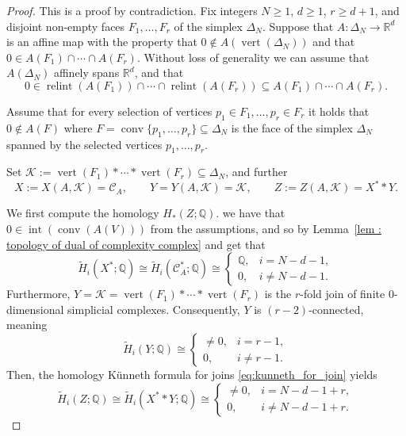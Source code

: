 \documentclass[a4paper,11pt,reqno, english]{amsart}
\theoremstyle{definition}
\theoremstyle{remark}
\newcommand\R{\mathbb R}
\newcommand\Q{\mathbb Q}
\newcommand\CC{\mathscr C}
\DeclareMathOperator{\vertex}{\mathrm{vert}}
\DeclareMathOperator{\interior}{\mathrm{int}}
\DeclareMathOperator{\relint}{\mathrm{relint}}
\DeclareMathOperator{\conv}{\mathrm{conv}}
\begin{document}
\begin{proof}
	This is a proof by contradiction.
	Fix integers $N\geq 1$, $d\geq 1$,  $r\geq d+1$, and disjoint non-empty faces $F_1,\dots, F_{r}$ of the simplex $\Delta_N$.
	Suppose that $A\colon \Delta_N\longrightarrow\R^d$ is an affine map with the property that $0\notin A(\vertex(\Delta_N))$ and that
	$
		0\in A(F_1)\cap\cdots\cap A(F_r)
	$.
	Without loss of generality we can assume that $A(\Delta_N)$ affinely spans $\R^d$, and that
	\[
		0\in \relint( A(F_1))\cap\cdots\cap  \relint(A( F_r)) \subseteq A(F_1)\cap\cdots\cap A(F_r).
	\]

	\medskip
	Assume that for every selection of vertices $p_1\in F_1,\dots, p_r\in F_r$ it holds that $0\notin A(F)$ where $F=\conv\{p_1,\dots,p_r\}\subseteq\Delta_N$ is the face of the simplex $\Delta_N$ spanned by the selected vertices  $p_1,\dots,p_r$.

	\medskip
	Set $\mathcal{K}:=\vertex ({F_1})*\cdots* \vertex ({F_r})\subseteq\Delta_N$, and further
	\[
		X:=X(A,\mathcal{K})=\CC_A,\qquad Y=Y(A,\mathcal{K})=\mathcal{K}, \qquad Z:=Z(A,\mathcal{K})=X^**Y.
	\]

	\medskip
	We first compute the homology $H_*(Z;\Q)$.
	we have that $0\in \interior(\conv (A(V)))$ from the assumptions, and so by
	Lemma~\ref{lem : topology of dual of complexity complex} and get that
	\[
		\widetilde{H}_i(X^*;\Q)\cong \widetilde{H}_i(\CC_A^*;\Q) \cong
		\begin{cases}
			\Q, & i= N-d-1 ,    \\
			0,  & i\neq N-d-1 .
		\end{cases}
	\]
	Furthermore, $Y=\mathcal{K}=\vertex ({F_1})*\cdots* \vertex ({F_r})$ is the $r$-fold join of finite $0$-dimensional simplicial complexes.
	Consequently, $Y$ is $(r-2)$-connected, meaning
	\[
		\widetilde{H}_i(Y;\Q) \cong
		\begin{cases}
			\neq 0, & i= r-1,    \\
			0,      & i\neq r-1.
		\end{cases}
	\]
	Then, the homology K\"unneth formula for joins \eqref{eq:kunneth_for_join} yields
	\begin{equation}
		\label{eq : homology of Z -- C01}
		\widetilde{H}_i(Z;\Q) \cong \widetilde{H}_i(X^**Y;\Q) \cong
		\begin{cases}
			\neq 0, & i= N-d-1+r,      \\
			0,      & i\neq  N-d-1+r .
		\end{cases}
	\end{equation}


\end{proof}
\end{document}
